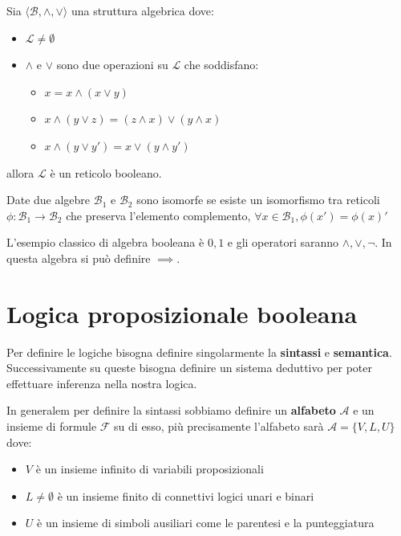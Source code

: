 \begin{definizione}
    Sia $\langle \mathcal{B}, \land,\lor\rangle$ una struttura algebrica dove:
    \begin{itemize}
        \item $\mathcal{L}\ne \emptyset$
        \item $\land$ e $\lor$ sono due operazioni su  $\mathcal{L}$ che soddisfano:
        \begin{itemize}
            \item $x= x\land (x\lor y)$
            \item $x\land (y\lor z) = (z\land x) \lor (y\land x)$
            \item $x\land(y\lor y') = x\lor(y\land y')$
        \end{itemize}
    \end{itemize}
    allora $\mathcal{L}$ è un reticolo booleano.
\end{definizione}


\begin{definizione}
    Date due algebre $\mathcal{B}_1$ e $\mathcal{B}_2$ sono isomorfe se esiste un
    isomorfismo tra reticoli $\phi:\mathcal{B}_1\to \mathcal{B}_2$ che preserva 
    l'elemento complemento, $\forall x\in \mathcal{B}_1, \phi(x') = \phi(x)'$
\end{definizione}

\begin{esempio}
L'esempio classico di algebra booleana è $0, 1$ e gli operatori saranno $\land, \lor,\lnot$.
In questa algebra si può definire $\implies$.
\end{esempio}

\section{Logica proposizionale booleana}
Per definire le logiche bisogna definire singolarmente la \textbf{sintassi} e 
\textbf{semantica}. Successivamente su queste bisogna definire un sistema deduttivo 
per poter effettuare inferenza nella nostra logica.

In generalem per definire la sintassi sobbiamo definire un \textbf{alfabeto} $\mathcal{A}$
e un insieme di formule $\mathcal{F}$ su di esso, più precisamente l'alfabeto sarà
$\mathcal{A} =\{V, L, U\}$ dove:
\begin{itemize}
    \item $V$ è un insieme infinito di variabili proposizionali
    \item $L\ne \emptyset$ è un insieme finito di connettivi logici unari e binari
    \item $U$ è un insieme di simboli ausiliari come le parentesi e la punteggiatura
\end{itemize}

